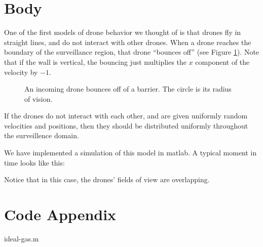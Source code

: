 \documentclass{article}
\begin{document}
\section{Body}
One of the first models of drone behavior we thought of is that drones fly
	in straight lines, and do not interact with other drones.
When a drone reaches the boundary of the surveillance region, that drone
	``bounces off'' (see Figure \ref{fig:drone-barrier-bounce}).
Note that if the wall is vertical, the bouncing just multiplies the $x$
	component of the velocity by $-1$.

\begin{figure}[h]
\begin{center}
\end{center}
\caption{An incoming drone bounces off of a barrier.  The circle is its radius
	of vision.}
\label{fig:drone-barrier-bounce}
\end{figure}


If the drones do not interact with each other, and are given uniformly random
	velocities and positions, then they should be distributed uniformly throughout
	the surveillence domain.

We have implemented a simulation of this model in matlab.
A typical moment in time looks like this:

\begin{figure}[h]
\begin{center}
\begin{tikzpicture}
\end{tikzpicture}
\end{center}
\end{figure}

Notice that in this case, the drones' fields of view are overlapping.

\section{Code Appendix}

{ideal-gas.m}
\end{document}
